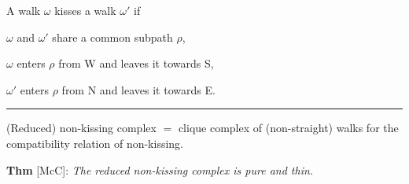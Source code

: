 \documentclass[portrait,final,a0paper,fontscale=0.25]{baposter}
\theoremstyle{definition}
\begin{document}
\begin{poster}
{\medskip

A walk $\omega$ {\color{green} kisses} a walk $\omega'$ if 
\begin{compactitem}
\item $\omega$ and $\omega'$ share a common subpath $\rho$,
\item $\omega$ enters $\rho$ from W and leaves it towards S,
\item $\omega'$ enters $\rho$ from N and leaves it towards E.
\end{compactitem}

\vspace{-.15cm}
\hspace{-.25cm}
{\color{green} \rule{10.02cm}{1pt}}
\vspace{-.35cm}

{\color{green} (Reduced) non-kissing complex} $=$ clique complex of (non-straight) walks for the compatibility relation of non-kissing.

\medskip
{\color{green} \bf Thm} [McC]: {\it The reduced non-kissing complex is pure and thin.}

}

\end{poster}
\end{document}
